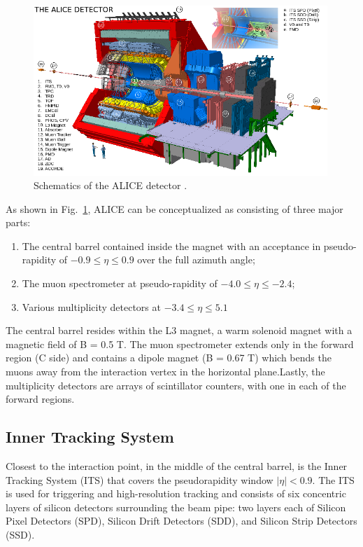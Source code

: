 \begin{figure}[htpb]
  \centering
  \includegraphics[width=0.99\textwidth]{Experimental_Aparatus/ALICE.png}
  \caption{Schematics of the ALICE detector \cite{Tauro:2263642}.}
  \label{fig:alice}
\end{figure}

As shown in Fig.~\ref{fig:alice}, ALICE can be conceptualized as consisting of three major parts:

\begin{enumerate}
    \item The central barrel contained inside the magnet with an acceptance in pseudo-rapidity of $-0.9 \leq \eta \leq 0.9$ over the full azimuth angle;
    \item The muon spectrometer at pseudo-rapidity of $-4.0 \leq \eta \leq -2.4$; 
    \item Various multiplicity detectors at $-3.4 \leq \eta \leq 5.1$
\end{enumerate}

The central barrel resides within the L3 magnet, a warm solenoid magnet with a magnetic field of B = 0.5 T. The muon spectrometer extends only in the forward region (C side) and contains a dipole magnet (B = 0.67 T) which bends the muons away from the interaction vertex in the horizontal plane.Lastly, the multiplicity detectors are arrays of scintillator counters, with one in each of the forward regions.

\subsection{Inner Tracking System}
\label{sec:ITS}
Closest to the interaction point, in the middle of the central barrel, is the Inner Tracking System (ITS) that covers the pseudorapidity window $|\eta| < 0.9$. The ITS is used for triggering and high-resolution tracking and consists of six concentric layers of silicon detectors surrounding the beam pipe: two layers each of Silicon Pixel Detectors (SPD), Silicon Drift Detectors (SDD), and Silicon Strip Detectors (SSD). 

